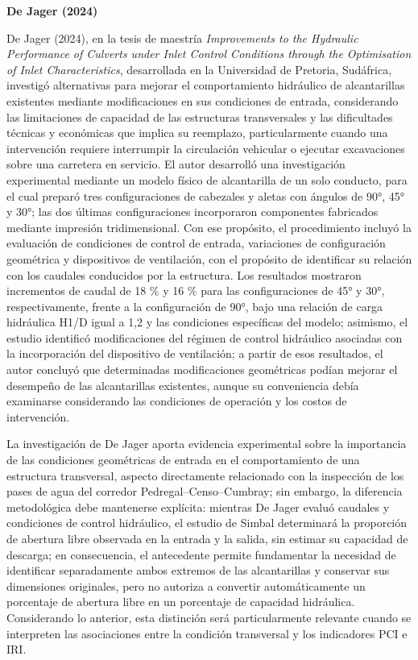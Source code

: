 \noindent\textbf{De Jager (2024)}

De Jager (2024), en la tesis de maestría \textit{Improvements to the Hydraulic Performance of Culverts under Inlet Control Conditions through the Optimisation of Inlet Characteristics}, desarrollada en la Universidad de Pretoria, Sudáfrica, investigó alternativas para mejorar el comportamiento hidráulico de alcantarillas existentes mediante modificaciones en sus condiciones de entrada, considerando las limitaciones de capacidad de las estructuras transversales y las dificultades técnicas y económicas que implica su reemplazo, particularmente cuando una intervención requiere interrumpir la circulación vehicular o ejecutar excavaciones sobre una carretera en servicio. El autor desarrolló una investigación experimental mediante un modelo físico de alcantarilla de un solo conducto, para el cual preparó tres configuraciones de cabezales y aletas con ángulos de 90°, 45° y 30°; las dos últimas configuraciones incorporaron componentes fabricados mediante impresión tridimensional. Con ese propósito, el procedimiento incluyó la evaluación de condiciones de control de entrada, variaciones de configuración geométrica y dispositivos de ventilación, con el propósito de identificar su relación con los caudales conducidos por la estructura. Los resultados mostraron incrementos de caudal de 18 \% y 16 \% para las configuraciones de 45° y 30°, respectivamente, frente a la configuración de 90°, bajo una relación de carga hidráulica H1/D igual a 1,2 y las condiciones específicas del modelo; asimismo, el estudio identificó modificaciones del régimen de control hidráulico asociadas con la incorporación del dispositivo de ventilación; a partir de esos resultados, el autor concluyó que determinadas modificaciones geométricas podían mejorar el desempeño de las alcantarillas existentes, aunque su conveniencia debía examinarse considerando las condiciones de operación y los costos de intervención.

La investigación de De Jager aporta evidencia experimental sobre la importancia de las condiciones geométricas de entrada en el comportamiento de una estructura transversal, aspecto directamente relacionado con la inspección de los pases de agua del corredor Pedregal–Censo–Cumbray; sin embargo, la diferencia metodológica debe mantenerse explícita: mientras De Jager evaluó caudales y condiciones de control hidráulico, el estudio de Simbal determinará la proporción de abertura libre observada en la entrada y la salida, sin estimar su capacidad de descarga; en consecuencia, el antecedente permite fundamentar la necesidad de identificar separadamente ambos extremos de las alcantarillas y conservar sus dimensiones originales, pero no autoriza a convertir automáticamente un porcentaje de abertura libre en un porcentaje de capacidad hidráulica. Considerando lo anterior, esta distinción será particularmente relevante cuando se interpreten las asociaciones entre la condición transversal y los indicadores PCI e IRI.

